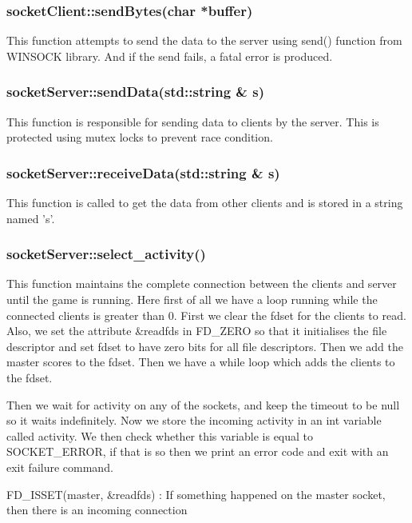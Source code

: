\documentclass{article}
\begin{document}
\subsubsection{socketClient::sendBytes(char *buffer) }
This function attempts to send the data to the server using send() function from WINSOCK library. And if the send fails, a fatal error is produced.
\newline

\subsubsection{socketServer::sendData(std::string & s)}
This function is responsible for sending data to clients by the server. This is protected using mutex locks to prevent race condition.
\newline

\subsubsection{socketServer::receiveData(std::string & s) }
This function is called to get the data from other clients and is stored in a string named ’s’.
\newline

\subsubsection{socketServer::select\_activity() }
This function maintains the complete connection between the clients and server until the game is running. Here first of all we have a loop running while the connected clients is greater than 0. First we clear the fdset for the clients to read. Also, we set the attribute &readfds in FD\_ZERO so that it initialises the file descriptor and set fdset to have zero bits for all file descriptors. Then we add the master scores to the fdset. Then we have a while loop which adds the clients to the fdset. \newline

Then we wait for activity on any of the sockets, and keep the timeout to be null so it waits indefinitely. Now we store the incoming activity in an int variable called activity. We then check whether this variable is equal to SOCKET\_ERROR, if that is so then we print an error code and exit with an exit failure command. \newline

FD\_ISSET(master, \&readfds) : If something happened on the master socket, then there is an incoming connection \newline
\end{document}
